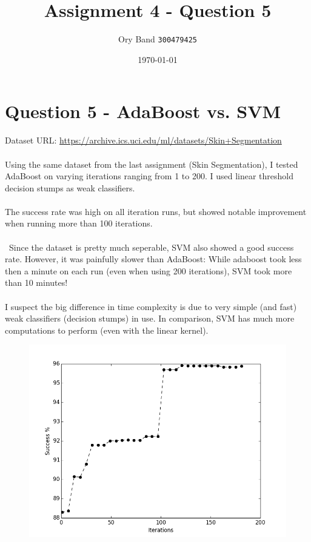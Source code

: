\documentclass[a4paper]{article}
\title{Assignment 4 - Question 5}
\author{Ory Band \texttt{300479425}}
\date{\today}
\begin{document}
\section {Question 5 - AdaBoost vs. SVM}

Dataset URL: \url{https://archive.ics.uci.edu/ml/datasets/Skin+Segmentation}
\\\\
Using the same dataset from the last assignment (Skin Segmentation),
I tested AdaBoost on varying iterations ranging from 1 to 200.
I used linear threshold decision stumps as weak classifiers.
\\\\
The success rate was high on all iteration runs,
but showed notable improvement when running more than 100 iterations.
\\\\\
Since the dataset is pretty much seperable, SVM also showed a good success rate.
However, it was painfully slower than AdaBoost:
While adaboost took less then a minute on each run (even when using 200 iterations),
SVM took more than 10 minutes!
\\\\
I suspect the big difference in time complexity
is due to very simple (and fast) weak classifiers (decision stumps) in use.
In comparison, SVM has much more computations to perform (even with the linear kernel).

\begin{figure}[h!]
    \includegraphics[width=1\textwidth]{adaboost_iterations.png}
\end{figure}
\end{document}
